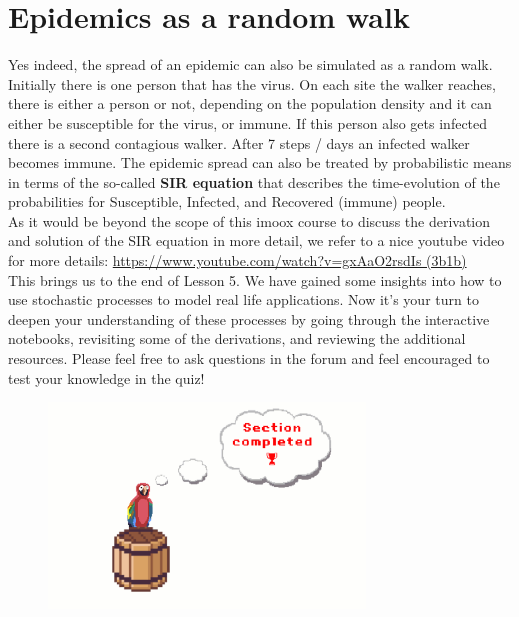 \documentclass[12pt, a4paper]{scrartcl}
\begin{document}
\section*{Epidemics as a random walk}
Yes indeed, the spread of an epidemic can also be simulated as a random walk.
Initially there is one person that has the virus.
On each site the walker reaches, there is either a person or not, depending on the population density and it can either be susceptible for the virus, or immune. If this person also gets infected there is a second contagious walker. After 7 steps / days an infected walker becomes immune.
The epidemic spread can also be treated by probabilistic means in terms of the so-called \textbf{SIR equation} that describes the time-evolution of the probabilities for Susceptible, Infected, and Recovered (immune) people.  \\
As it would be beyond the scope of this imoox course to discuss the derivation and solution of the SIR equation in more detail, we refer to a nice youtube video for more details:
\url{https://www.youtube.com/watch?v=gxAaO2rsdIs (3b1b)}\\


This brings us to the end of Lesson 5.
We have gained some insights into how to use stochastic processes to model real life applications. Now it's your turn to deepen your understanding of these processes by going through the interactive notebooks, revisiting some of the derivations, and reviewing the additional resources. 
Please feel free to ask questions in the forum and feel encouraged to test your knowledge in the quiz!
 \begin{figure}[H]
	\centering
	\includegraphics[width=0.75\textwidth]{5_14.png}
\end{figure}
\end{document}
